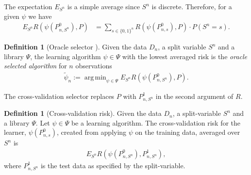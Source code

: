 \documentclass[11pt, a4paper]{article}
\theoremstyle{definition}
\newtheorem{definition}[theorem]{Definition}
\theoremstyle{remark}
\DeclareMathOperator*{\argmin}{arg\,min}
\newcommand{\la}{\psi}
\newcommand{\Sn}{S^n}
\newcommand{\lib}{\Psi}
\begin{document}
\noindent The expectation $ E_{\Sn} $ is a simple average since $ \Sn $ is discrete. Therefore, for a given $ \la $ we have 
\begin{align*}
    E_{\Sn} R( \la(P_{n,\Sn}^{0}), P) &= \sum_{s \in \{0,1\}^{n}} R(\la(P_{n, s}^{0}), P) \cdot P(\Sn = s). 
\end{align*}
\begin{definition}[Oracle selector \parencite{laan03}]
Given the data $ D_n $, a split variable $ \Sn $ and a library $ \lib $, the learning algorithm $ \la \in \lib $ with the lowest averaged risk is the \textit{oracle selected algorithm} for $ n $ observations
    \begin{align*}
        \tilde{\la}_n := \argmin_{\la \in \lib} E_{\Sn} R(\la(P_{n,\Sn}^0 ) , P).
    \end{align*}
\end{definition}

\noindent The cross-validation selector replaces $ P $ with $ P_{n, \Sn}^{1} $ in the second argument of $ R $.
\begin{definition}[Cross-validation risk]
     Given the data $D_n$, a split-variable $\Sn$ and a library $ \lib $. Let $ \la \in \lib $ be a learning algorithm. The cross-validation risk for the learner, $\la(P_{n,s}^0)$, created from applying $ \la $ on the training data, averaged over $ \Sn $ is  
    \begin{align*}
        E_{\Sn} R( \la(P_{n,\Sn}^{0}), P_{n, \Sn}^{1}),
    \end{align*}
    where $ P_{n,\Sn}^{1} $ is the test data as specified by the split-variable.
\end{definition}
\end{document}
